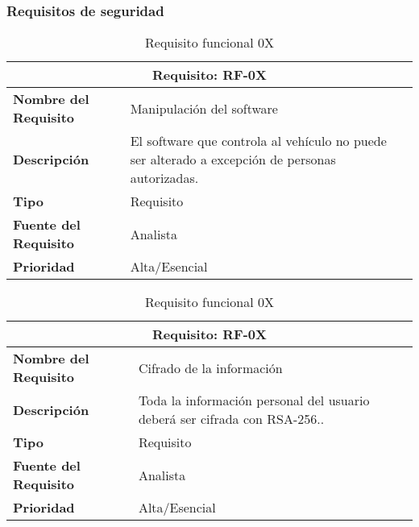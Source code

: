 \documentclass[10pt,a4paper,oldfontcommands]{dpds}
\begin{document}
\subsubsection{Requisitos de seguridad}

\begin{table}[H]
\begin{center}
\begin{tabular}{p{} p{7cm}}
\multicolumn{2}{c}{\textbf{Requisito: RF-0X} } \\
\hline \hline
\textbf{Nombre del Requisito} & Manipulación del software\\
\textbf{Descripción} & El software que controla al vehículo no puede ser alterado a excepción de personas autorizadas.\\
\textbf{Tipo} & Requisito  \\
\textbf{Fuente del Requisito} & Analista  \\
\textbf{Prioridad} & Alta/Esencial \\ \hline
\end{tabular}
\caption{Requisito funcional 0X}
\label{tab:personal}
\end{center}
\end{table}

\begin{table}[H]
\begin{center}
\begin{tabular}{p{} p{7cm}}
\multicolumn{2}{c}{\textbf{Requisito: RF-0X} } \\
\hline \hline
\textbf{Nombre del Requisito} & Cifrado de la información\\
\textbf{Descripción} & Toda la información personal del usuario deberá ser cifrada con RSA-256..\\
\textbf{Tipo} & Requisito  \\
\textbf{Fuente del Requisito} & Analista  \\
\textbf{Prioridad} & Alta/Esencial \\ \hline
\end{tabular}
\caption{Requisito funcional 0X}
\label{tab:personal}
\end{center}
\end{table}
\end{document}
